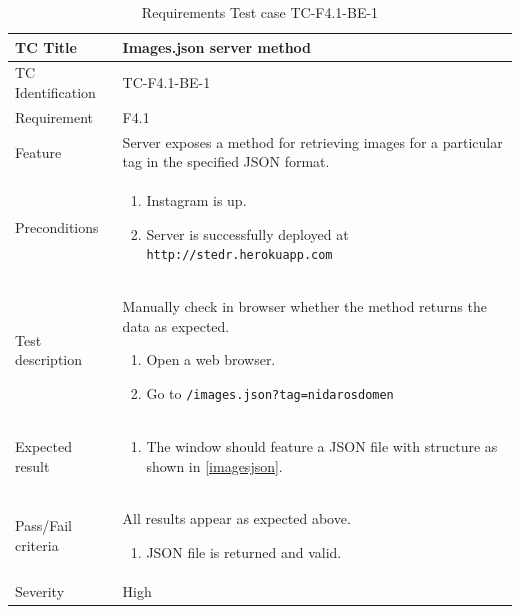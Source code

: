 \documentclass[11pt]{book}
\begin{document}
\begin{table}
  \begin{tabular}{| p{3cm} | p{9.5cm} |} \hline 
    TC Title              & Images.json server method \\ \hline 
    TC Identification     & TC-F4.1-BE-1 \\ \hline 
    Requirement           & F4.1 \\ \hline 
    Feature               & Server exposes a method for retrieving images for a particular tag in the specified JSON format. \\ \hline 
    Preconditions         & \begin{enumerate}
                              \item Instagram is up.
                              \item Server is successfully deployed at \texttt{http://stedr.herokuapp.com}
                            \end{enumerate} \\ \hline 

    Test description      & Manually check in browser whether the method returns the data as expected.

                            \begin{enumerate}
                              \item Open a web browser.
                              \item Go to \texttt{/images.json?tag=nidarosdomen}
                            \end{enumerate} \\ \hline 
    Expected result       & \begin{enumerate}
                              \item The window should feature a JSON file with structure as shown in \ref{imagesjson}.
                            \end{enumerate} \\ \hline 
    Pass/Fail criteria    & All results appear as expected above.
                            \begin{enumerate}
                              \item JSON file is returned and valid.
                            \end{enumerate} \\ \hline 
    Severity              & High \\ \hline 
  \end{tabular}
  \caption{Requirements Test case TC-F4.1-BE-1}
  \label{tab:TCF4.1BE1}
\end{table}
\end{document}
